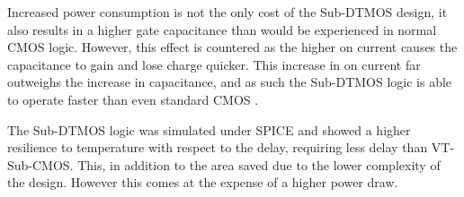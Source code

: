 Increased power consumption is not the only cost of the Sub-DTMOS design, it also results in a higher gate capacitance than would be experienced in normal CMOS logic.
However, this effect is countered as the higher on current causes the capacitance to gain and lose charge quicker.
This increase in on current far outweighs the increase in capacitance, and as such the Sub-DTMOS logic is able to operate faster than even standard CMOS \cite{IEEEVLSIRobustSTL}.

The Sub-DTMOS logic was simulated under SPICE and showed a higher resilience to temperature with respect to the delay, requiring less delay than VT-Sub-CMOS.
This, in addition to the area saved due to the lower complexity of the design.
However this comes at the expense of a higher power draw.
